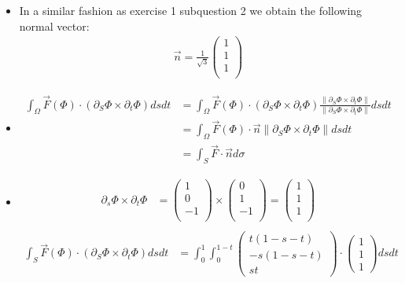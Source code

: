 \documentclass[11pt]{article}
\begin{document}
\begin{solution}     
    \begin{itemize}
    \item  In a similar fashion as exercise 1 subquestion 2 we obtain the following normal vector:
	\begin{align*}
		\vec{n} = \frac{1}{\sqrt{3}} \begin{pmatrix}1\\1\\1\\\end{pmatrix}
	\end{align*}
    \item
	\begin{align*}
        \int_{\Omega} \vec{F}(\Phi) \cdot  ( \partial_S \Phi \times \partial_t \Phi ) dsdt &=\int_{\Omega} \vec{F}(\Phi) \cdot  ( \partial_S \Phi \times \partial_t \Phi )\frac{\|\partial_S \Phi \times \partial_t \Phi \|}{\|\partial_S \Phi \times \partial_t \Phi \|} dsdt \\
        &=\int_{\Omega} \vec{F}(\Phi) \cdot \vec{n}\|\partial_S \Phi \times \partial_t \Phi \| dsdt \\
        &=\int_S \vec{F}\cdot \vec{n} d\sigma
	\end{align*}
    \item
	\begin{align*}
        \partial_s\Phi\times\partial_t\Phi &= \begin{pmatrix}1\\0\\-1\\\end{pmatrix}\times\begin{pmatrix}0\\1\\-1\\\end{pmatrix} = \begin{pmatrix}1\\1\\1\\\end{pmatrix}\\
    \end{align*}
	\begin{align*}
        \int_S \vec{F}(\Phi) \cdot  ( \partial_S \Phi \times \partial_t \Phi ) dsdt &= \int_0^1 \int_0^{1-t} \begin{pmatrix}t(1-s-t)\\-s(1-s-t)\\st\end{pmatrix}\cdot  \begin{pmatrix}1\\1\\1\end{pmatrix} ds dt\\

\end{align*}
\end{itemize}
\end{solution}
\end{document}
